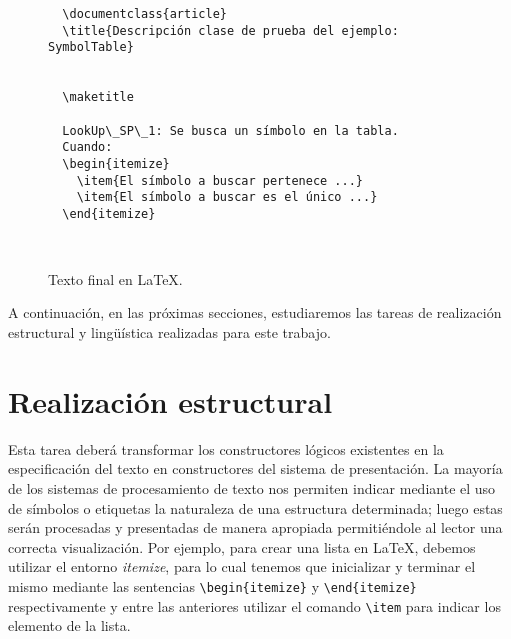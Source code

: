 \begin{figure}[H]
  \begin{verbatim}
  \documentclass{article}
  \title{Descripción clase de prueba del ejemplo: SymbolTable}
  
  
  \maketitle

  LookUp\_SP\_1: Se busca un símbolo en la tabla.  
  Cuando:
  \begin{itemize}
    \item{El símbolo a buscar pertenece ...}
    \item{El símbolo a buscar es el único ...}   
  \end{itemize}
  
  
  \end{verbatim}
  \caption{Texto final en \LaTeX.}
  \label{fig:ej_latex}
\end{figure}

A continuación, en las próximas secciones, estudiaremos las tareas de realización estructural y lingüística realizadas para este trabajo.

\section{Realización estructural}
\label{cap:structure_realization}


Esta tarea deberá transformar los constructores lógicos existentes en la especificación del texto en constructores del sistema de presentación. La mayoría de los sistemas de procesamiento de texto nos permiten indicar mediante el uso de símbolos o etiquetas la naturaleza de una estructura determinada; luego estas serán procesadas y presentadas de manera apropiada permitiéndole al lector una correcta visualización. Por ejemplo, para crear una lista en \LaTeX, debemos utilizar el entorno \emph{itemize}, para lo cual tenemos que inicializar y terminar el mismo mediante las sentencias \verb|\begin{itemize}| y \verb|\end{itemize}| respectivamente y entre las anteriores utilizar el comando \verb|\item| para indicar los elemento de la lista.

